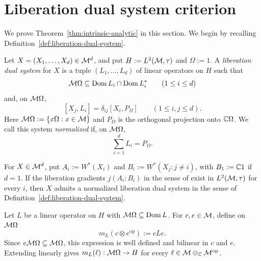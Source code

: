 \section{Liberation dual system criterion}
\label{sec:liberation-dual-system-criterion}

We prove Theorem~\ref{thm:intrinsic-analytic} in this section.
We begin by recalling Definition~\ref{def:liberation-dual-system}.

\begin{definition*}
Let $X=(X_1,\ldots,X_d)\in\mathcal M^d$, and put $H:=L^2(\mathcal M,\tau)$ and $\Omega:=1$.
A \emph{liberation dual system} for $X$ is a tuple $(L_1,\ldots,L_d)$ of linear operators on $H$ such that
\[
 \mathcal M\Omega\subseteq\operatorname{Dom} L_i\cap\operatorname{Dom} L_i^*
 \qquad(1\leq i\leq d)
\]
and, on $\mathcal M\Omega$,
\[
 [X_j,L_i]=\delta_{ij}[X_i,P_\Omega]
 \qquad(1\leq i,j\leq d).
\]
Here $\mathcal M\Omega:=\{x\Omega:x\in\mathcal M\}$ and $P_\Omega$ is the orthogonal projection onto $\mathbb C\Omega$.
We call this system \emph{normalized} if, on $\mathcal M\Omega$,
\[
 \sum_{i=1}^dL_i=P_\Omega.
\]
\end{definition*}

\begin{remark}\label{rem:liberation-gradients}
For $X\in\mathcal M^d$, put $A_i:=W^*(X_i)$ and $B_i:=W^*(X_j:j\ne i)$, with $B_1:=\mathbb C1$ if $d=1$.
If the liberation gradients $j(A_i:B_i)$ in the sense of \cite[Sections~5.3--5.4]{Voi99} exist in $L^2(\mathcal M,\tau)$ for every $i$, then $X$ admits a normalized liberation dual system in the sense of Definition~\ref{def:liberation-dual-system}.
\end{remark}

Let $L$ be a linear operator on $H$ with $\mathcal M\Omega\subseteq\operatorname{Dom} L$.
For $c,e\in\mathcal M$, define on $\mathcal M\Omega$
\[
 m_L(c\otimes e^{\mathrm{op}}):=cLe.
\]
Since $e\mathcal M\Omega\subseteq\mathcal M\Omega$, this expression is well defined and bilinear in $c$ and $e$.
Extending linearly gives $m_L(\ell):\mathcal M\Omega\to H$ for every $\ell\in\mathcal M\otimes_{\mathbb C}\mathcal M^{\mathrm{op}}$.

